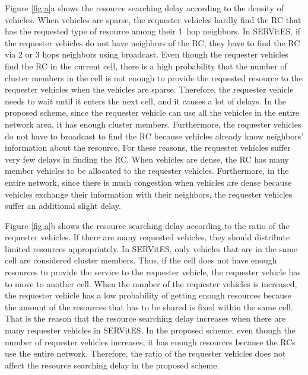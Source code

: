 \documentclass[sensors,article,accept,moreauthors,pdftex]{Definitions/mdpi}
\begin{document}
Figure \ref{fig:a}a shows the resource searching delay according to the density of vehicles.
When vehicles are sparse, the requester vehicles hardly find the RC that has the requested type of resource among their 1~hop neighbors.
In SERVitES, if the requester vehicles do not have neighbors of the RC, they have to find the RC via {2 or 3} %
 hops neighbors using broadcast.
Even though the requester vehicles find the RC in the current cell, there is a high probability that the number of cluster members in the cell is not enough to provide the requested resource to the requester vehicles when the vehicles are sparse.
Therefore, the requester vehicle needs to wait until it enters the next cell, and it causes a lot of delays.
In the proposed scheme, since the requester vehicle can use all the vehicles in the entire network area, it has enough cluster members.
Furthermore, the requester vehicles do not have to broadcast to find the RC because vehicles already know neighbors' information about the resource.
For these reasons, the requester vehicles suffer very few delays in finding the RC.
When vehicles are dense, the RC has many member vehicles to be allocated to the requester vehicles.
Furthermore, in the entire network, since there is much congestion when vehicles are dense because vehicles exchange their information with their neighbors, the requester vehicles suffer an additional slight delay.

Figure \ref{fig:a}b shows the resource searching delay according to the ratio of the requester vehicles.
If there are many requested vehicles, they should distribute limited resources appropriately.
In SERVitES, only vehicles that are in the same cell are considered cluster members.
Thus, if the cell does not have enough resources to provide the service to the requester vehicle, the requester vehicle has to move to another cell.
When the number of the requester vehicles is increased, the requester vehicle has a low probability of getting enough resources because the amount of the resources that has to be shared is fixed within the same cell.
That is the reason that the resource searching delay increases when there are many requester vehicles in SERVitES.
In the proposed scheme, even though the number of requester vehicles increases, it has enough resources because the RCs use the entire network.
Therefore, the ratio of the requester vehicles does not affect the resource searching delay in the proposed scheme.
\end{document}
